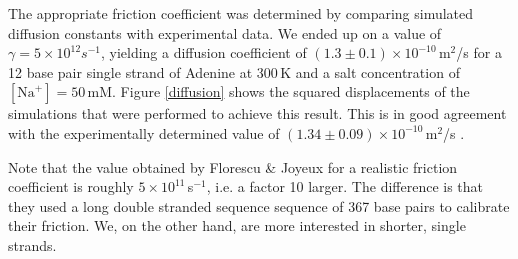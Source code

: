 The appropriate friction coefficient was determined by comparing simulated diffusion constants with experimental data. We ended up on a value of $\gamma = 5 \times 10^{12} s^{-1}$, yielding a diffusion coefficient of $(1.3 \pm 0.1) \times 10^{-10}$\,m$^2$/s for a 12 base pair single strand of Adenine at 300\,K and a salt concentration of $[\text{Na}^+] = 50$\,mM.
Figure \ref{diffusion} shows the squared displacements of the simulations that were performed to achieve this result. This is in good agreement with the experimentally determined value of $(1.34 \pm 0.09) \times 10^{-10}$\,m$^2$/s \cite{stellwagen2001measuring, bonifacio1997comparison, eimer1991rotational}. 

Note that the value obtained by Florescu \& Joyeux for a realistic friction coefficient is roughly $5\times 10^{11}$\,s$^{-1}$, i.e. a factor 10 larger. The difference is that they used a long double stranded sequence sequence of 367 base pairs to calibrate their friction. We, on the other hand, are more interested in shorter, single strands.



